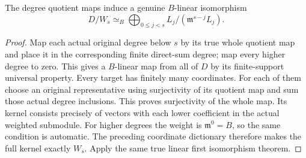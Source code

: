 \begin{theorem}
\label{hir:relative-normal-actual-weighted-layer-quotient-decomposition}
\leanok
The degree quotient maps induce a genuine $B$-linear isomorphism
\[
 D/W_s\simeq_B\bigoplus_{0\leq j<s}
     L_j/(\mathfrak m^{s-j}L_j).
\]
\end{theorem}
\begin{proof}
Map each actual original degree below $s$ by its true whole quotient
map and place it in the corresponding finite direct-sum degree;
map every higher degree to zero. This gives a $B$-linear map from
all of $D$ by its finite-support universal property. Every target
has finitely many coordinates. For each of them choose an original
representative using surjectivity of its quotient map and sum those
actual degree inclusions. This proves surjectivity of the whole map.
Its kernel consists precisely of vectors with each lower coefficient
in the actual weighted submodule. For higher degrees the weight is
$\mathfrak m^0=B$, so the same condition is automatic. The preceding
coordinate dictionary therefore makes the full kernel exactly $W_s$.
Apply the same true linear first isomorphism theorem.
\end{proof}

